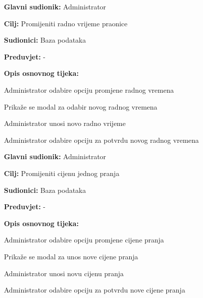 \noindent {}
\begin{packed_item}
	
	\item \textbf{Glavni sudionik: } Administrator
	\item  \textbf{Cilj:} Promijeniti radno vrijeme praonice
	\item  \textbf{Sudionici:} Baza podataka
	\item  \textbf{Preduvjet:} -
	\item  \textbf{Opis osnovnog tijeka:}
	
	\item[] \begin{packed_enum}
		
		\item Administrator odabire opciju promjene radnog vremena
		\item Prikaže se modal za odabir novog radnog vremena
		\item Administrator unosi novo radno vrijeme
		\item Administrator odabire opciju za potvrdu novog radnog vremena
	\end{packed_enum}
\end{packed_item}

\noindent {}
\begin{packed_item}
	
	\item \textbf{Glavni sudionik: } Administrator
	\item  \textbf{Cilj:} Promijeniti cijenu jednog pranja
	\item  \textbf{Sudionici:} Baza podataka
	\item  \textbf{Preduvjet:} -
	\item  \textbf{Opis osnovnog tijeka:}
	
	\item[] \begin{packed_enum}
		
		\item Administrator odabire opciju promjene cijene pranja
		\item Prikaže se modal za unos nove cijene pranja
		\item Administrator unosi novu cijenu pranja
		\item Administrator odabire opciju za potvrdu nove cijene pranja
	\end{packed_enum}
\end{packed_item}

